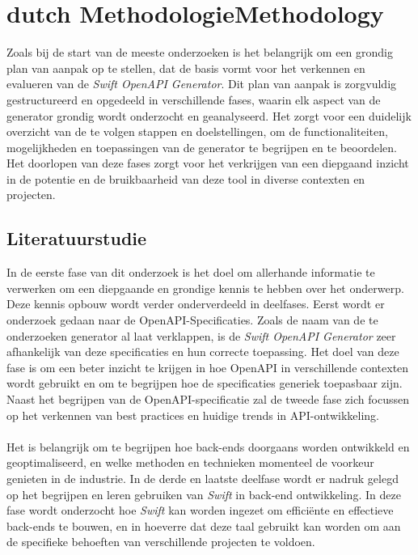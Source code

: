 
\chapter
{\IfLanguageName
    {dutch}
    {Methodologie}{Methodology}}%
\label{ch:methodologie}

Zoals bij de start van de meeste onderzoeken is het belangrijk om een grondig plan van aanpak op 
te stellen, dat de basis vormt voor het verkennen en evalueren van de \textit{Swift OpenAPI Generator}. 
Dit plan van aanpak is zorgvuldig gestructureerd en opgedeeld in verschillende fases, waarin elk aspect van de generator grondig wordt onderzocht en geanalyseerd. 
Het zorgt voor een duidelijk overzicht van de te volgen stappen en doelstellingen, om de functionaliteiten, mogelijkheden en toepassingen van de generator te begrijpen en te beoordelen. 
Het doorlopen van deze fases zorgt voor het verkrijgen van een diepgaand inzicht in de potentie en de bruikbaarheid van deze tool in diverse contexten en projecten. 

\section{Literatuurstudie}
In de eerste fase van dit onderzoek is het doel om allerhande informatie te verwerken om een diepgaande en grondige kennis te hebben over het onderwerp. Deze kennis opbouw wordt verder onderverdeeld in deelfases. Eerst wordt er onderzoek gedaan naar de OpenAPI-Specificaties. Zoals de naam van de te onderzoeken generator al laat verklappen, is de \textit{Swift OpenAPI Generator} zeer afhankelijk van deze specificaties en hun correcte toepassing. Het doel van deze fase is om een beter inzicht te krijgen in hoe OpenAPI in verschillende contexten wordt gebruikt en om te begrijpen hoe de specificaties generiek toepasbaar zijn. Naast het begrijpen van de OpenAPI-specificatie zal de tweede fase zich focussen op het verkennen van best practices en huidige trends in API-ontwikkeling.  \\ \\ Het is belangrijk om te begrijpen hoe back-ends doorgaans worden ontwikkeld en geoptimaliseerd, en welke methoden en technieken momenteel de voorkeur genieten in de industrie. In de derde en laatste deelfase wordt er nadruk gelegd op het begrijpen en leren gebruiken van \textit{Swift} in back-end ontwikkeling. In deze fase wordt onderzocht hoe \textit{Swift} kan worden ingezet om efficiënte en effectieve back-ends te bouwen, en in hoeverre dat deze taal gebruikt kan worden om aan de specifieke behoeften van verschillende projecten te voldoen. 


